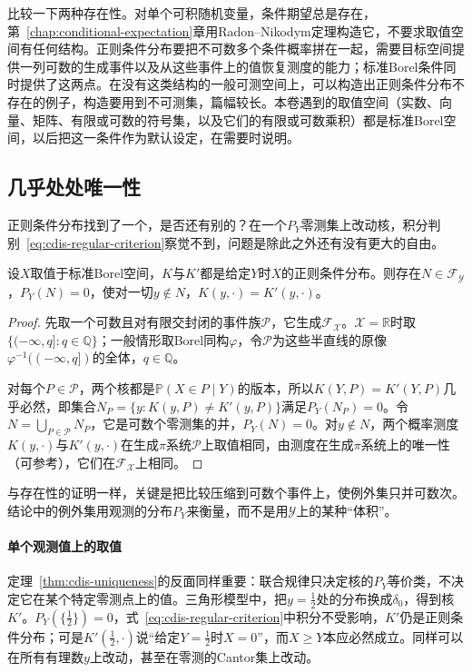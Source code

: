 比较一下两种存在性。对单个可积随机变量，条件期望总是存在，第~\ref{chap:conditional-expectation}章用Radon--Nikodym定理构造它，不要求取值空间有任何结构。正则条件分布要把不可数多个条件概率拼在一起，需要目标空间提供一列可数的生成事件以及从这些事件上的值恢复测度的能力；标准Borel条件同时提供了这两点。在没有这类结构的一般可测空间上，可以构造出正则条件分布不存在的例子，构造要用到不可测集，篇幅较长。本卷遇到的取值空间（实数、向量、矩阵、有限或可数的符号集，以及它们的有限或可数乘积）都是标准Borel空间，以后把这一条件作为默认设定，在需要时说明。

\subsection{几乎处处唯一性}
\label{sec:cdis-uniqueness}

正则条件分布找到了一个，是否还有别的？在一个$P_Y$零测集上改动核，积分判别~\eqref{eq:cdis-regular-criterion}察觉不到，问题是除此之外还有没有更大的自由。

\begin{theorem}[正则条件分布的几乎处处唯一性]
\label{thm:cdis-uniqueness}
设$X$取值于标准Borel空间，$K$与$K'$都是给定$Y$时$X$的正则条件分布。则存在$N\in\mathcal{F}_{\mathcal{Y}}$，$P_Y(N)=0$，使对一切$y\notin N$，$K(y,\cdot)=K'(y,\cdot)$。
\end{theorem}

\begin{proof}
先取一个可数且对有限交封闭的事件族$\mathcal{P}$，它生成$\mathcal{F}_{\mathcal{X}}$。$\mathcal{X}=\mathbb{R}$时取$\{(-\infty,q]:q\in\mathbb{Q}\}$；一般情形取Borel同构$\varphi$，令$\mathcal{P}$为这些半直线的原像$\varphi^{-1}((-\infty,q])$的全体，$q\in\mathbb{Q}$。

对每个$P\in\mathcal{P}$，两个核都是$\mathbb{P}(X\in P\mid Y)$的版本，所以$K(Y,P)=K'(Y,P)$几乎必然，即集合$N_P=\{y:K(y,P)\neq K'(y,P)\}$满足$P_Y(N_P)=0$。令$N=\bigcup_{P\in\mathcal{P}}N_P$，它是可数个零测集的并，$P_Y(N)=0$。对$y\notin N$，两个概率测度$K(y,\cdot)$与$K'(y,\cdot)$在生成$\pi$系统$\mathcal{P}$上取值相同，由测度在生成$\pi$系统上的唯一性（可参考），它们在$\mathcal{F}_{\mathcal{X}}$上相同。
\end{proof}

与存在性的证明一样，关键是把比较压缩到可数个事件上，使例外集只并可数次。结论中的例外集用观测的分布$P_Y$来衡量，而不是用$\mathcal{Y}$上的某种“体积”。

\paragraph{单个观测值上的取值}
定理~\ref{thm:cdis-uniqueness}的反面同样重要：联合规律只决定核的$P_Y$等价类，不决定它在某个特定零测点上的值。三角形模型中，把$y=\tfrac12$处的分布换成$\delta_0$，得到核$K'$。$P_Y(\{\tfrac12\})=0$，式~\eqref{eq:cdis-regular-criterion}中积分不受影响，$K'$仍是正则条件分布；可是$K'(\tfrac12,\cdot)$说“给定$Y=\tfrac12$时$X=0$”，而$X\geq Y$本应必然成立。同样可以在所有有理数$y$上改动，甚至在零测的Cantor集上改动。

